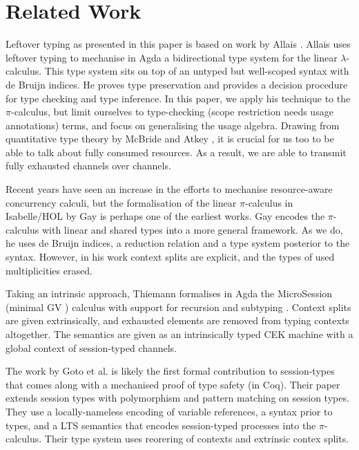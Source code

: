 \documentclass[a4paper,UKenglish,cleveref,autoref,thm-restate,authorcolumns]{lipics-v2019}
\theoremstyle{definition}
\newcommand{\lambdacalc}{$\lambda$-calculus}
\newcommand{\picalc}{$\pi$-calculus}
\begin{document}
\section{Related Work}

Leftover typing as presented in this paper is based on work by Allais \cite{Allais2018a}.
Allais uses leftover typing to mechanise in Agda a bidirectional type system for the linear \lambdacalc{}.
This type system sits on top of an untyped but well-scoped syntax with de Bruijn indices.
He proves type preservation and provides a decision procedure for type checking and type inference.
In this paper, we apply his technique to the \picalc{}, but limit ourselves to type-checking (scope restriction needs usage annotations) terms, and focus on generalising the usage algebra.
Drawing from quantitative type theory by McBride and Atkey \cite{McBride2016, Atkey2018}, it is crucial for us too to be able to talk about fully consumed resources.
As a result, we are able to transmit fully exhausted channels over channels.

Recent years have seen an increase in the efforts to mechanise resource-aware concurrency calculi, but the formalisation of the linear \picalc{} in Isabelle/HOL by Gay \cite{Gay2001} is perhaps one of the earliest works.
Gay encodes the \picalc{} with linear and shared types into a more general framework.
As we do, he uses de Bruijn indices, a reduction relation and a type system posterior to the syntax.
However, in his work context splits are explicit, and the types of used multiplicities erased.

Taking an intrinsic approach, Thiemann formalises in Agda the MicroSession (minimal GV \cite{}) calculus with support for recursion and subtyping \cite{Thiemann2019}.
Context splits are given extrinsically, and exhausted elements are removed from typing contexts altogether.
The semantics are given as an intrinsically typed CEK machine with a global context of session-typed channels.

The work by Goto et al. \cite{Goto2016a} is likely the first formal contribution to session-types that comes along with a mechanised proof of type safety (in Coq). 
Their paper extends session types with polymorphism and pattern matching on session types.
They use a locally-nameless encoding of variable references, a syntax prior to types, and a LTS semantics that encodes session-typed processes into the \picalc{}.
Their type system uses reorering of contexts and extrinsic contex splits. 
\end{document}
